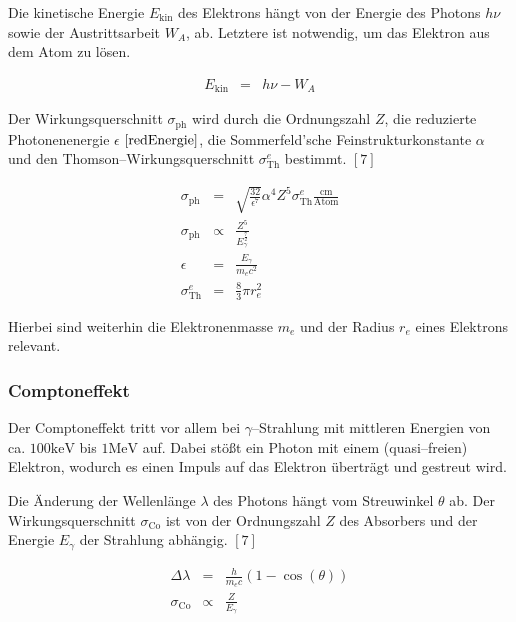 \documentclass[12pt,a4paper]{scrartcl}
\numberwithin{equation}{section} %
\newcommand{\pu}[1]{\ensuremath{\mathrm{#1}}}
\renewcommand{\[}{} %
\renewcommand{\]}{\noindent} %
\begin{document}
Die kinetische Energie \(E_\mathrm{kin}\) des Elektrons hängt von der
Energie des Photons \(h\nu\) sowie der Austrittsarbeit \(W_A\), ab.
Letztere ist notwendig, um das Elektron aus dem Atom zu lösen.

\[
\begin{eqnarray}
    E_\mathrm{kin} &=& h\nu - W_A
\end{eqnarray}
\]

Der Wirkungsquerschnitt \(\sigma_\mathrm{ph}\) wird durch die
Ordnungszahl \(Z\), die reduzierte Photonenenergie \(\epsilon\)
\(\eqref{redEnergie}\), die Sommerfeld'sche Feinstrukturkonstante
\(\alpha\) und den Thomson--Wirkungsquerschnitt \(\sigma_\mathrm{Th}^e\)
bestimmt. \([7]\)

\[
\begin{eqnarray}
    \sigma_\mathrm{ph}
        &=& \sqrt{\frac{32}{\epsilon^7}}\alpha^4 Z^5
            \sigma_\mathrm{Th}^e \pu{\frac{cm}{Atom}} \\
    \sigma_\mathrm{ph}
        &\propto& \frac{Z^5}{E_\gamma^{\frac{7}{2}}} \\
    \epsilon &=& \frac{E_\gamma}{m_ec^2} \label{redEnergie} \\
    \sigma_\mathrm{Th}^e &=& \frac{8}{3} \pi r_e^2
\end{eqnarray}
\]

Hierbei sind weiterhin die Elektronenmasse \(m_e\) und der Radius
\(r_e\) eines Elektrons relevant.

\hypertarget{comptoneffekt}{%
\subsubsection{Comptoneffekt}\label{comptoneffekt}}

Der Comptoneffekt tritt vor allem bei \(\gamma\)--Strahlung mit
mittleren Energien von ca. \(\pu{100 keV}\) bis \(\pu{1 MeV}\) auf.
Dabei stößt ein Photon mit einem (quasi--freien) Elektron, wodurch es
einen Impuls auf das Elektron überträgt und gestreut wird.

Die Änderung der Wellenlänge \(\lambda\) des Photons hängt vom
Streuwinkel \(\theta\) ab. Der Wirkungsquerschnitt
\(\sigma_\mathrm{Co}\) ist von der Ordnungszahl \(Z\) des Absorbers und
der Energie \(E_\gamma\) der Strahlung abhängig. \([7]\)

\[
\begin{eqnarray}
    \Delta \lambda &=& \frac{h}{m_e c} (1 - \cos(\theta)) \\
    \sigma_\mathrm{Co} &\propto & \frac{Z}{E_\gamma}
\end{eqnarray}
\]
\end{document}
